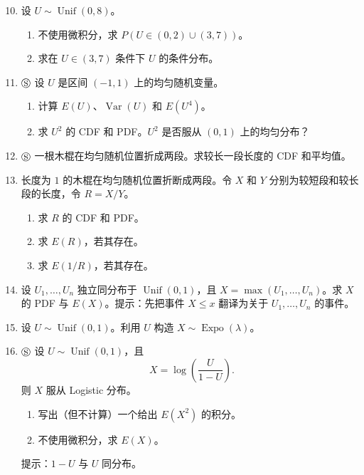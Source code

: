 \documentclass[UTF8,12pt,a4paper,fontset=fandol]{ctexart}
\begin{document}
\begin{enumerate}
  \setcounter{enumi}{9}
  \item 设 $U\sim\operatorname{Unif}(0,8)$。
  \begin{enumerate}
    \item 不使用微积分，求 $P(U\in(0,2)\cup(3,7))$。
    \item 求在 $U\in(3,7)$ 条件下 $U$ 的条件分布。
  \end{enumerate}

  \item $\circledS$ 设 $U$ 是区间 $(-1,1)$ 上的均匀随机变量。
  \begin{enumerate}
    \item 计算 $E(U)$、$\operatorname{Var}(U)$ 和 $E(U^4)$。
    \item 求 $U^2$ 的 CDF 和 PDF。$U^2$ 是否服从 $(0,1)$ 上的均匀分布？
  \end{enumerate}

  \item $\circledS$ 一根木棍在均匀随机位置折成两段。求较长一段长度的 CDF 和平均值。

  \item 长度为 $1$ 的木棍在均匀随机位置折断成两段。令 $X$ 和 $Y$ 分别为较短段和较长段的长度，令 $R=X/Y$。
  \begin{enumerate}
    \item 求 $R$ 的 CDF 和 PDF。
    \item 求 $E(R)$，若其存在。
    \item 求 $E(1/R)$，若其存在。
  \end{enumerate}

  \item 设 $U_1,\ldots,U_n$ 独立同分布于 $\operatorname{Unif}(0,1)$，且 $X=\max(U_1,\ldots,U_n)$。求 $X$ 的 PDF 与 $E(X)$。提示：先把事件 $X\le x$ 翻译为关于 $U_1,\ldots,U_n$ 的事件。

  \item 设 $U\sim\operatorname{Unif}(0,1)$。利用 $U$ 构造 $X\sim\operatorname{Expo}(\lambda)$。

  \item $\circledS$ 设 $U\sim\operatorname{Unif}(0,1)$，且
  \[
    X=\log\left(\frac{U}{1-U}\right).
  \]
  则 $X$ 服从 Logistic 分布。
  \begin{enumerate}
    \item 写出（但不计算）一个给出 $E(X^2)$ 的积分。
    \item 不使用微积分，求 $E(X)$。
  \end{enumerate}
  提示：$1-U$ 与 $U$ 同分布。


\end{enumerate}
\end{document}
